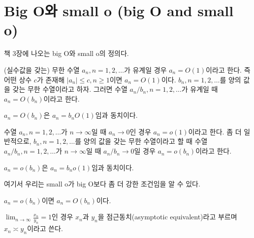 \documentclass[b5paper,]{scrbook}
\theoremstyle{plain}
\theoremstyle{definition}
\numberwithin{equation}{section}
\let\BeginKnitrBlock\begin \let\EndKnitrBlock\end
\begin{document}
\hypertarget{big-o-small-o-big-o-and-small-o}{%
\section{Big O와 small o (big O and small o)}\label{big-o-small-o-big-o-and-small-o}}

\citep{Jiang2010} 책 3장에 나오는 big O와 small o의 정의다.

\BeginKnitrBlock{definition}[big O]
\protect\hypertarget{def:unnamed-chunk-173}{}{\label{def:unnamed-chunk-173} {} }(실수값을 갖는) 무한 수열 \(a_{n},n=1,2,\ldots\)가 유계일 경우 \(a_{n}=O(1)\)이라고 한다. 즉 어떤 상수 \(c\)가 존재해 \(|a_{n}|\leq c, n\geq 1\)이면 \(a_{n}=O(1)\)이다. \(b_{n},n=1,2,\ldots\)를 양의 값을 갖는 무한 수열이라고 하자. 그러면 수열 \(a_{n}/b_{n}, n=1,2,\ldots\)가 유계일 때 \(a_{n}=O(b_{n})\)이라고 한다.
\EndKnitrBlock{definition}

\BeginKnitrBlock{lemma}
\protect\hypertarget{lem:unnamed-chunk-174}{}{\label{lem:unnamed-chunk-174} }\(a_{n}=O(b_{n})\)은 \(a_{n}=b_{n}O(1)\)임과 동치이다.
\EndKnitrBlock{lemma}

\BeginKnitrBlock{definition}[small o]
\protect\hypertarget{def:unnamed-chunk-175}{}{\label{def:unnamed-chunk-175} {} }수열 \(a_{n},n=1,2,\ldots\)가 \(n\rightarrow\infty\)일 때 \(a_{n}\rightarrow 0\)인 경우 \(a_{n}=o(1)\)이라고 한다. 좀 더 일반적으로, \(b_{n},n=1,2,\ldots\)를 양의 값을 갖는 무한 수열이라고 할 때 수열 \(a_{n}/b_{n}, n=1,2,\ldots\)가 \(n\rightarrow \infty\)일 때 \(a_{n}/b_{n}\rightarrow 0\)일 경우 \(a_{n}=o(b_{n})\)이라고 한다.
\EndKnitrBlock{definition}

\BeginKnitrBlock{lemma}
\protect\hypertarget{lem:unnamed-chunk-176}{}{\label{lem:unnamed-chunk-176} }\(a_{n}=o(b_{n})\)은 \(a_{n}=b_{n}o(1)\)임과 동치이다.
\EndKnitrBlock{lemma}

여기서 우리는 small o가 big O보다 좀 더 강한 조건임을 알 수 있다.

\BeginKnitrBlock{lemma}
\protect\hypertarget{lem:unnamed-chunk-177}{}{\label{lem:unnamed-chunk-177} }\(a_{n}=o(b_{n})\)이면 \(a_{n}=O(b_{n})\)이다.
\EndKnitrBlock{lemma}

\BeginKnitrBlock{definition}[점근동치]
\protect\hypertarget{def:unnamed-chunk-178}{}{\label{def:unnamed-chunk-178} {} }\(\lim_{n\rightarrow \infty}\frac{x_n}{y_n}=1\)인 경우 \(x_{n}\)과 \(y_{n}\)을 점근동치(asymptotic equivalent)라고 부르며 \(x_{n}\asymp y_{n}\)이라고 쓴다.
\EndKnitrBlock{definition}
\end{document}
